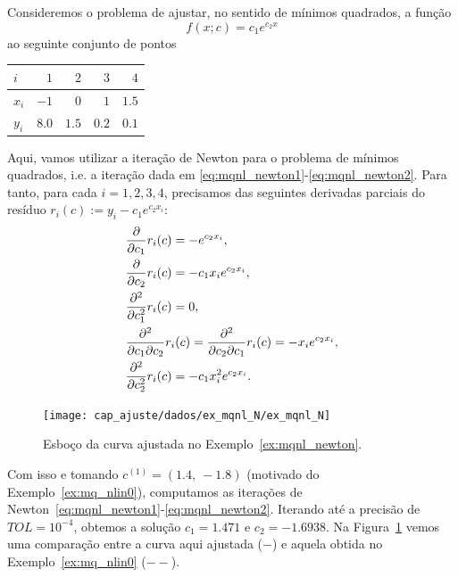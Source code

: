 \begin{ex}\label{ex:mqnl_newton}
  Consideremos o problema de ajustar, no sentido de mínimos quadrados, a função
  \begin{equation}
    f(x;c) = c_1e^{c_2x}
  \end{equation}
ao seguinte conjunto de pontos
\begin{center}
  \begin{tabular}{l|rrrr}
    $i$ & $1$ & $2$ & $3$ & $4$ \\\hline
    $x_i$ & $-1$ & $0$ & $1$ & $1.5$\\
    $y_i$ & $8.0$ & $1.5$ & $0.2$ & $0.1$\\\hline
  \end{tabular}
\end{center}

Aqui, vamos utilizar a iteração de Newton para o problema de mínimos quadrados, i.e. a iteração dada em \eqref{eq:mqnl_newton1}-\eqref{eq:mqnl_newton2}. Para tanto, para cada $i=1, 2, 3, 4$, precisamos das seguintes derivadas parciais do resíduo $r_i(c) := y_i - c_1e^{c_2x_i}$:
\begin{align}
  &\frac{\partial}{\partial c_1}r_i(c) = - e^{c_2x_i},\\
  &\frac{\partial}{\partial c_2}r_i(c) = - c_1x_ie^{c_2x_i},\\
  &\frac{\partial^2}{\partial c_1^2}r_i(c) = 0,\\
  &\frac{\partial^2}{\partial c_1\partial c_2}r_i(c) = \frac{\partial^2}{\partial c_2\partial c_1}r_i(c) = - x_ie^{c_2x_i},\\
  &\frac{\partial^2}{\partial c_2^2}r_i(c) = - c_1x_i^2e^{c_2x_i}.
\end{align}

\begin{figure}[h]
  \centering
  \texttt{[image: cap\_ajuste/dados/ex\_mqnl\_N/ex\_mqnl\_N]}
  \caption{Esboço da curva ajustada no Exemplo~\ref{ex:mqnl_newton}.}
  \label{fig:ex_mqnl_newton}
\end{figure}

Com isso e tomando $c^{(1)} = (1.4, ~-1.8)$ (motivado do Exemplo~\ref{ex:mq_nlin0}), computamos as iterações de Newton~\eqref{eq:mqnl_newton1}-\eqref{eq:mqnl_newton2}. Iterando até a precisão de $TOL = 10^{-4}$, obtemos a solução $c_1 = 1.471$ e $c_2 = -1.6938$. Na Figura~\ref{fig:ex_mqnl_newton} vemos uma comparação entre a curva aqui ajustada ($-$) e aquela obtida no Exemplo~\ref{ex:mq_nlin0} ($--$).



\end{ex}
